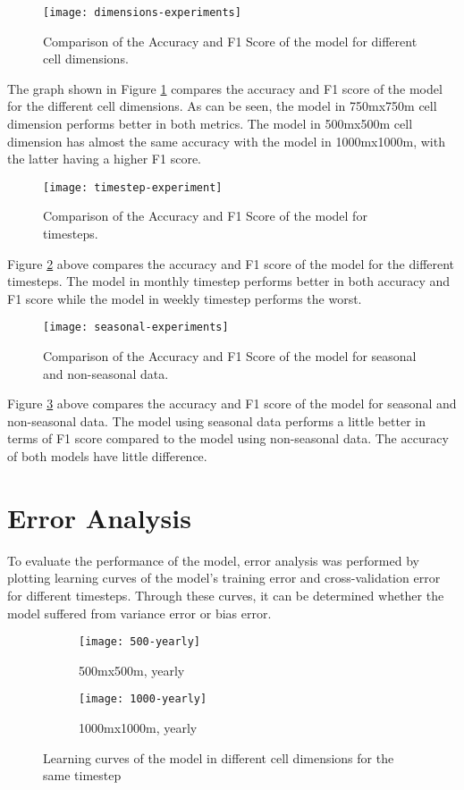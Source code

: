     \begin{figure}[H]
    \centering
    \texttt{[image: dimensions-experiments]}
    \caption{Comparison of the Accuracy and F1 Score of the model for different cell dimensions.}
    \label{fig:dimension-experiments}
    \end{figure}
    The graph shown in Figure \ref{fig:dimension-experiments} compares the accuracy and F1 score of the model for the different cell dimensions. As can be seen, the model in 750mx750m cell dimension performs better in both metrics. The model in 500mx500m cell dimension has almost the same accuracy with the model in 1000mx1000m, with the latter having a higher F1 score.

    \begin{figure}[H]
    \centering
    \texttt{[image: timestep-experiment]}
    \caption{Comparison of the Accuracy and F1 Score of the model for timesteps.}
    \label{fig:timestep-experiments}
    \end{figure}
    Figure \ref{fig:timestep-experiments} above compares the accuracy and F1 score of the model for the different timesteps. The model in monthly timestep performs better in both accuracy and F1 score while the model in weekly timestep performs the worst.
    
    \begin{figure}[H]
    \centering
    \texttt{[image: seasonal-experiments]}
    \caption{Comparison of the Accuracy and F1 Score of the model for seasonal and non-seasonal data.}
    \label{fig:seasonal-experiments}
    \end{figure}
    Figure \ref{fig:seasonal-experiments} above compares the accuracy and F1 score of the model for seasonal and non-seasonal data. The model using seasonal data performs a little better in terms of F1 score compared to the model using non-seasonal data. The accuracy of both models have little difference.

\section{Error Analysis}
    To evaluate the performance of the model, error analysis was performed by plotting learning curves of the model's training error and cross-validation error for different timesteps. Through these curves, it can be determined whether the model suffered from variance error or bias error.

    \begin{figure}[H]
    \centering
    \begin{subfigure}{.5\textwidth}
      \centering
      \texttt{[image: 500-yearly]}
      \caption{500mx500m, yearly}
    \end{subfigure}%
    \begin{subfigure}{.5\textwidth}
      \centering
      \texttt{[image: 1000-yearly]}
      \caption{1000mx1000m, yearly}
    \end{subfigure}
    \caption{Learning curves of the model in different cell dimensions for the same timestep}
    \label{fig:dimension-learning-curve}
    \end{figure}

